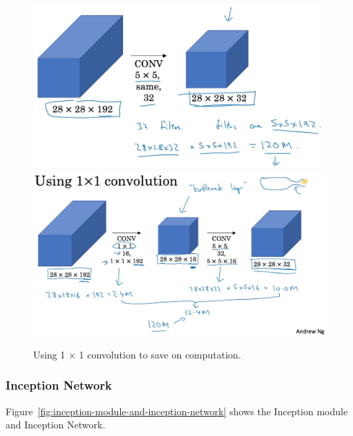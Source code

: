 \documentclass[UTF8]{article}
\begin{document}
\begin{figure}[htb]
    \centering
    \includegraphics[width=30em]{figures/problem-of-computation-cost}
    \includegraphics[width=40em]{figures/using-1-by-1-conv-to-save-computation}
    \caption{Using 1 $\times$ 1 convolution to save on computation.}
    \label{fig:using-1-by-1-conv-to-save-computation}
\end{figure}

\subsubsection{Inception Network}
Figure~\ref{fig:inception-module-and-inception-network} shows the Inception module and Inception
Network.
\end{document}
